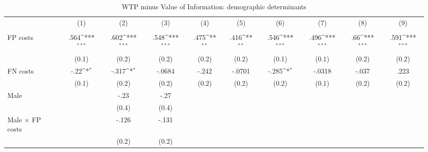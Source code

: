 \begin{table}[htbp]\centering
\def\sym#1{\ifmmode^{#1}\else\(^{#1}\)\fi}
\caption{WTP minus Value of Information: demographic determinants}
\begin{tabular}{l*{9}{c}}
\hline\hline
                &\multicolumn{1}{c}{(1)}&\multicolumn{1}{c}{(2)}&\multicolumn{1}{c}{(3)}&\multicolumn{1}{c}{(4)}&\multicolumn{1}{c}{(5)}&\multicolumn{1}{c}{(6)}&\multicolumn{1}{c}{(7)}&\multicolumn{1}{c}{(8)}&\multicolumn{1}{c}{(9)}\\
                &\multicolumn{1}{c}{}&\multicolumn{1}{c}{}&\multicolumn{1}{c}{}&\multicolumn{1}{c}{}&\multicolumn{1}{c}{}&\multicolumn{1}{c}{}&\multicolumn{1}{c}{}&\multicolumn{1}{c}{}&\multicolumn{1}{c}{}\\
\hline
FP costs        &     .564\sym{***}&     .602\sym{***}&     .548\sym{***}&     .475\sym{**} &     .416\sym{**} &     .546\sym{***}&     .496\sym{***}&      .66\sym{***}&     .591\sym{***}\\
                &    (0.1)         &    (0.2)         &    (0.2)         &    (0.2)         &    (0.2)         &    (0.1)         &    (0.1)         &    (0.2)         &    (0.2)         \\
FN costs        &     -.22\sym{*}  &    -.317\sym{*}  &   -.0684         &    -.242         &   -.0701         &    -.285\sym{*}  &   -.0318         &    -.037         &     .223         \\
                &    (0.1)         &    (0.2)         &    (0.2)         &    (0.2)         &    (0.2)         &    (0.2)         &    (0.1)         &    (0.2)         &    (0.2)         \\
Male            &                  &     -.23         &     -.27         &                  &                  &                  &                  &                  &                  \\
                &                  &    (0.4)         &    (0.4)         &                  &                  &                  &                  &                  &                  \\
Male $\times$ FP costs&                  &    -.126         &    -.131         &                  &                  &                  &                  &                  &                  \\
                &                  &    (0.2)         &    (0.2)         &                  &                  &                  &                  &                  &                  \\

\end{tabular}
\end{table}
